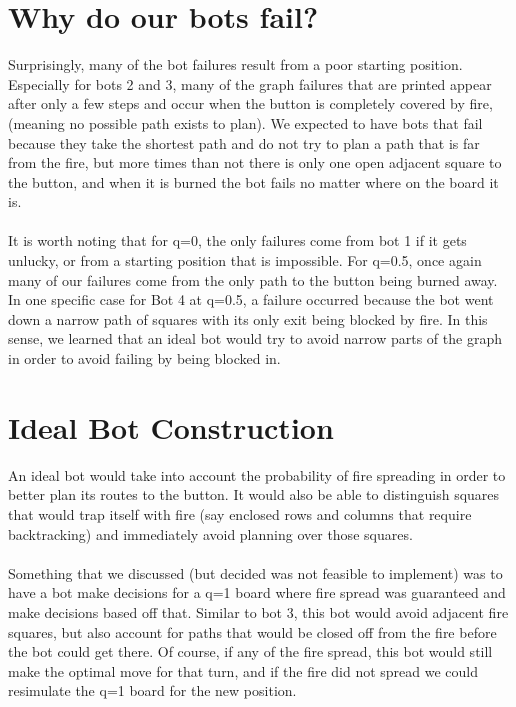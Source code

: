 \documentclass[12pt]{article}
\begin{document}
\section*{Why do our bots fail?}
Surprisingly, many of the bot failures result from a poor starting position. Especially for bots 2 and 3, many of the
graph failures that are printed appear after only a few steps and occur when the button is completely covered by fire,
(meaning no possible path exists to plan). We expected to have bots that fail because they take the shortest path 
and do not try to plan a path that is far from the fire, but more times than not there is only one open adjacent square 
to the button, and when it is burned the bot fails no matter where on the board it is. 
\\
\\
It is worth noting that for q=0, the only failures come from bot 1 if it gets unlucky, or from a starting position that is impossible. 
For q=0.5, once again many of our failures come from the only path to the button being burned away. In one specific case for
Bot 4 at q=0.5, a failure occurred because the bot went down a narrow path of squares with its only exit being blocked by fire. In this sense, 
we learned that an ideal bot would try to avoid narrow parts of the graph in order to avoid failing by being blocked in. 
\section*{Ideal Bot Construction}
An ideal bot would take into account the probability of fire spreading in order to better plan its routes 
to the button. It would also be able to distinguish squares that would trap itself with fire (say 
enclosed rows and columns that require backtracking) and immediately avoid planning over those squares. 
\\
\\
Something that we discussed (but decided was not feasible to implement) was to have a bot make decisions for a q=1 board where fire spread 
was guaranteed and make decisions based off that. Similar to bot 3, this bot would avoid adjacent fire squares, but also account for paths 
that would be closed off from the fire before the bot could get there. Of course, if any of the fire spread, this bot would still make 
the optimal move for that turn, and if the fire did not spread we could resimulate the q=1 board for the new position. 
\end{document}
